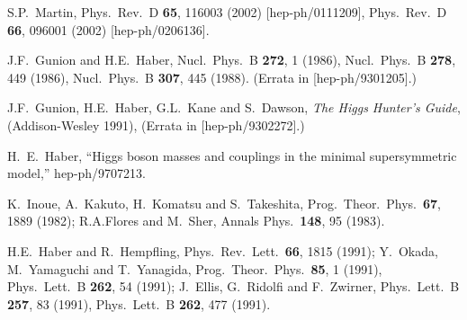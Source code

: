 \documentclass[12pt]{article}
\begin{document}
\begin{thebibliography}{999}
S.P.~Martin,
  Phys.\ Rev.\ D {\bf 65}, 116003 (2002)
  [hep-ph/0111209],
  Phys.\ Rev.\ D {\bf 66}, 096001 (2002)
  [hep-ph/0206136].
  
J.F.~Gunion and H.E.~Haber,
  Nucl.\ Phys.\ B {\bf 272}, 1 (1986),
  Nucl.\ Phys.\ B {\bf 278}, 449 (1986),
  Nucl.\ Phys.\ B {\bf 307}, 445 (1988).
  (Errata in [hep-ph/9301205].)

J.F.~Gunion, H.E.~Haber, G.L.~Kane and S.~Dawson,
  {\em The Higgs Hunter's Guide}, (Addison-Wesley 1991),  
  (Errata in [hep-ph/9302272].)

  H.~E.~Haber,
  ``Higgs boson masses and couplings in the minimal supersymmetric model,''
  hep-ph/9707213.

K.~Inoue, A.~Kakuto, H.~Komatsu and S.~Takeshita,
  Prog.\ Theor.\ Phys.\  {\bf 67}, 1889 (1982);
R.A.Flores and M.~Sher, 
  Annals Phys.\  {\bf 148}, 95 (1983).

H.E.~Haber and R.~Hempfling, 
  Phys.\ Rev.\ Lett.\  {\bf 66}, 1815 (1991);
Y.~Okada, M.~Yamaguchi and T.~Yanagida,
  Prog.\ Theor.\ Phys.\  {\bf 85}, 1 (1991),
  Phys.\ Lett.\ B {\bf 262}, 54 (1991);
J.~Ellis, G.~Ridolfi and F.~Zwirner,
  Phys.\ Lett.\ B {\bf 257}, 83 (1991),
  Phys.\ Lett.\ B {\bf 262}, 477 (1991).


\end{thebibliography}
\end{document}
